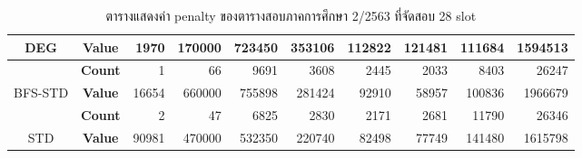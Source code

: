 \begin{table}[]
{\begin{tabular}{@{}ccrrrrrrrr@{}}
    \multirow{-2}{*}{{\color[HTML]{FE0000} DEG}} & {\color[HTML]{FE0000} \textbf{Value}} & {\color[HTML]{FE0000} 1970} & {\color[HTML]{FE0000} 170000} & {\color[HTML]{FE0000} 723450} & {\color[HTML]{FE0000} 353106} & {\color[HTML]{FE0000} 112822} & {\color[HTML]{FE0000} 121481} & {\color[HTML]{FE0000} 111684} & {\color[HTML]{FE0000} 1594513} \\ \midrule
                                                 & \textbf{Count}                        & 1                           & 66                            & 9691                          & 3608                          & 2445                          & 2033                          & 8403                          & 26247                          \\ \cmidrule(l){2-10} 
    \multirow{-2}{*}{BFS-STD}                    & \textbf{Value}                        & 16654                       & 660000                        & 755898                        & 281424                        & 92910                         & 58957                         & 100836                        & 1966679                        \\ \midrule
                                                 & \textbf{Count}                        & 2                           & 47                            & 6825                          & 2830                          & 2171                          & 2681                          & 11790                         & 26346                          \\ \cmidrule(l){2-10} 
    \multirow{-2}{*}{STD}                        & \textbf{Value}                        & 90981                       & 470000                        & 532350                        & 220740                        & 82498                         & 77749                         & 141480                        & 1615798                        \\ \bottomrule
    \end{tabular}%
    }
    \caption{ตารางแสดงค่า penalty ของตารางสอบภาคการศึกษา 2/2563 ที่จัดสอบ 28 slot}
    \label{tab:result_table_263_28}
\end{table}